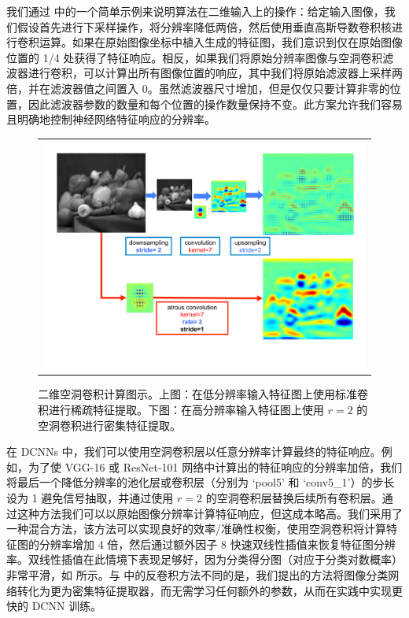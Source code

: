 我们通过  中的一个简单示例来说明算法在二维输入上的操作：给定输入图像，我们假设首先进行下采样操作，将分辨率降低两倍，然后使用垂直高斯导数卷积核进行卷积运算。如果在原始图像坐标中植入生成的特征图，我们意识到仅在原始图像位置的 1/4 处获得了特征响应。相反，如果我们将原始分辨率图像与空洞卷积滤波器进行卷积，可以计算出所有图像位置的响应，其中我们将原始滤波器上采样两倍，并在滤波器值之间置入 0。虽然滤波器尺寸增加，但是仅仅只要计算非零的位置，因此滤波器参数的数量和每个位置的操作数量保持不变。此方案允许我们容易且明确地控制神经网络特征响应的分辨率。

\begin{figure}
  \centering
  \begin{tabular}{c}
   	\includegraphics[width=.99 \linewidth]{fig/atrous_slide_rate.pdf}
   	\vspace{-.9cm}
  \end{tabular}
  \caption{二维空洞卷积计算图示。上图：在低分辨率输入特征图上使用标准卷积进行稀疏特征提取。下图：在高分辨率输入特征图上使用 $r=2$ 的空洞卷积进行密集特征提取。}\label{fig:hole2d}
\end{figure}

在 DCNNs 中，我们可以使用空洞卷积层以任意分辨率计算最终的特征响应。例如，为了使 VGG-16 或 ResNet-101 网络中计算出的特征响应的分辨率加倍，我们将最后一个降低分辨率的池化层或卷积层（分别为 `pool5' 和 `conv5\_1'）的步长设为 1 避免信号抽取，并通过使用 $r=2$ 的空洞卷积层替换后续所有卷积层。通过这种方法我们可以以原始图像分辨率计算特征响应，但这成本略高。我们采用了一种混合方法，该方法可以实现良好的效率/准确性权衡，使用空洞卷积将计算特征图的分辨率增加 4 倍，然后通过额外因子 8 快速双线性插值来恢复特征图分辨率。双线性插值在此情境下表现足够好，因为分类得分图（对应于分类对数概率）非常平滑，如  所示。与 \cite{long2014fully} 中的反卷积方法不同的是，我们提出的方法将图像分类网络转化为更为密集特征提取器，而无需学习任何额外的参数，从而在实践中实现更快的 DCNN 训练。

